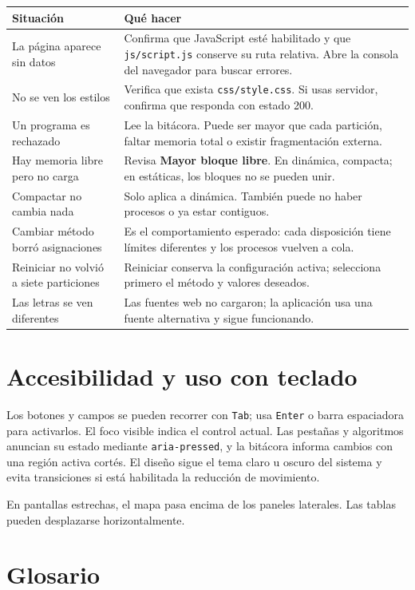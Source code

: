 \documentclass[11pt,a4paper]{article}
\newcommand{\control}[1]{\textsf{\textbf{#1}}}
\newcommand{\archivo}[1]{\texttt{#1}}
\begin{document}
\begin{longtable}{p{}p{}}
\toprule
\textbf{Situación} & \textbf{Qué hacer}\\
\midrule
\endhead
La página aparece sin datos & Confirma que JavaScript esté habilitado y que \archivo{js/script.js} conserve su ruta relativa. Abre la consola del navegador para buscar errores.\\
No se ven los estilos & Verifica que exista \archivo{css/style.css}. Si usas servidor, confirma que responda con estado 200.\\
Un programa es rechazado & Lee la bitácora. Puede ser mayor que cada partición, faltar memoria total o existir fragmentación externa.\\
Hay memoria libre pero no carga & Revisa \control{Mayor bloque libre}. En dinámica, compacta; en estáticas, los bloques no se pueden unir.\\
Compactar no cambia nada & Solo aplica a dinámica. También puede no haber procesos o ya estar contiguos.\\
Cambiar método borró asignaciones & Es el comportamiento esperado: cada disposición tiene límites diferentes y los procesos vuelven a cola.\\
Reiniciar no volvió a siete particiones & Reiniciar conserva la configuración activa; selecciona primero el método y valores deseados.\\
Las letras se ven diferentes & Las fuentes web no cargaron; la aplicación usa una fuente alternativa y sigue funcionando.\\
\bottomrule
\end{longtable}

\section{Accesibilidad y uso con teclado}

Los botones y campos se pueden recorrer con \texttt{Tab}; usa \texttt{Enter} o
barra espaciadora para activarlos. El foco visible indica el control actual. Las
pestañas y algoritmos anuncian su estado mediante \texttt{aria-pressed}, y la
bitácora informa cambios con una región activa cortés. El diseño sigue el tema
claro u oscuro del sistema y evita transiciones si está habilitada la reducción de
movimiento.

En pantallas estrechas, el mapa pasa encima de los paneles laterales. Las tablas
pueden desplazarse horizontalmente.

\section{Glosario}
\end{document}

